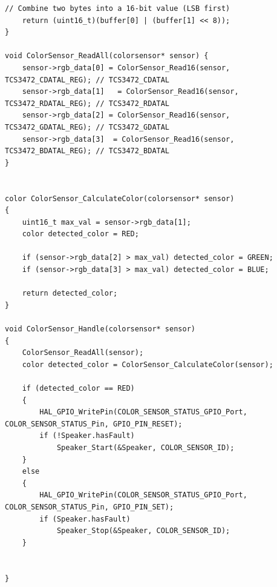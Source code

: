 \documentclass{article}
\begin{document}
\begin{lstlisting}[caption={Source Code : STM32 TCS34725 Firmware}, label={lst:stm32_colorsensor_code}]
    // Combine two bytes into a 16-bit value (LSB first)
    return (uint16_t)(buffer[0] | (buffer[1] << 8));
}

void ColorSensor_ReadAll(colorsensor* sensor) {
    sensor->rgb_data[0] = ColorSensor_Read16(sensor, TCS3472_CDATAL_REG); // TCS3472_CDATAL
    sensor->rgb_data[1]   = ColorSensor_Read16(sensor, TCS3472_RDATAL_REG); // TCS3472_RDATAL
    sensor->rgb_data[2] = ColorSensor_Read16(sensor, TCS3472_GDATAL_REG); // TCS3472_GDATAL
    sensor->rgb_data[3]  = ColorSensor_Read16(sensor, TCS3472_BDATAL_REG); // TCS3472_BDATAL
}


color ColorSensor_CalculateColor(colorsensor* sensor)
{
	uint16_t max_val = sensor->rgb_data[1];
	color detected_color = RED;

	if (sensor->rgb_data[2] > max_val) detected_color = GREEN;
	if (sensor->rgb_data[3] > max_val) detected_color = BLUE;

	return detected_color;
}

void ColorSensor_Handle(colorsensor* sensor)
{
	ColorSensor_ReadAll(sensor);
	color detected_color = ColorSensor_CalculateColor(sensor);

	if (detected_color == RED)
	{
		HAL_GPIO_WritePin(COLOR_SENSOR_STATUS_GPIO_Port, COLOR_SENSOR_STATUS_Pin, GPIO_PIN_RESET);
		if (!Speaker.hasFault)
			Speaker_Start(&Speaker, COLOR_SENSOR_ID);
	}
	else
	{
		HAL_GPIO_WritePin(COLOR_SENSOR_STATUS_GPIO_Port, COLOR_SENSOR_STATUS_Pin, GPIO_PIN_SET);
		if (Speaker.hasFault)
			Speaker_Stop(&Speaker, COLOR_SENSOR_ID);
	}


}
\end{lstlisting}
\end{document}
